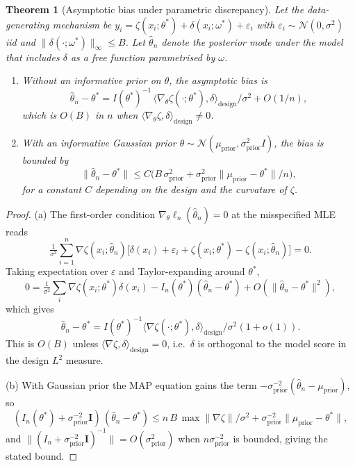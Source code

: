 \documentclass[11pt]{article}
\newtheorem{theorem}{Theorem}
\theoremstyle{definition}
\theoremstyle{remark}
\newcommand{\dotp}[2]{\langle #1, #2 \rangle}
\newcommand{\norm}[1]{\lVert #1 \rVert}
\begin{document}
\begin{theorem}[Asymptotic bias under parametric discrepancy]\label{thm:bias}
Let the data-generating mechanism be $y_i=\zeta(x_i;\theta^*)+\delta(x_i;\omega^*)+\varepsilon_i$
with $\varepsilon_i\sim\mathcal N(0,\sigma^2)$ iid and $\norm{\delta(\cdot;\omega^*)}_\infty\le B$. Let
$\hat\theta_n$ denote the posterior mode under the model that includes $\delta$ as a free
function parametrised by $\omega$.
\begin{enumerate}[label=(\alph*)]
  \item Without an informative prior on $\theta$, the asymptotic bias is
        \[
          \hat\theta_n-\theta^* = I(\theta^*)^{-1}\,\dotp{\nabla_\theta\zeta(\cdot;\theta^*)}{\delta}_{\mathrm{design}}/\sigma^2 + O(1/n),
        \]
        which is $O(B)$ in $n$ when $\dotp{\nabla_\theta\zeta}{\delta}_{\mathrm{design}}\neq 0$.
  \item With an informative Gaussian prior $\theta\sim\mathcal N(\mu_{\mathrm{prior}},\sigma_{\mathrm{prior}}^2 I)$, the bias is
        bounded by
        \[
          \norm{\hat\theta_n-\theta^*}\le C\bigl(B\,\sigma_{\mathrm{prior}}^2 + \sigma_{\mathrm{prior}}^2\norm{\mu_{\mathrm{prior}}-\theta^*}/n\bigr),
        \]
        for a constant $C$ depending on the design and the curvature of $\zeta$.
\end{enumerate}
\end{theorem}

\begin{proof}
(a) The first-order condition $\nabla_\theta\ell_n(\hat\theta_n)=0$ at the misspecified MLE
reads
\[
  \tfrac{1}{\sigma^2}\sum_{i=1}^n\nabla\zeta(x_i;\hat\theta_n)\bigl[\delta(x_i)+\varepsilon_i+\zeta(x_i;\theta^*)-\zeta(x_i;\hat\theta_n)\bigr]=0.
\]
Taking expectation over $\varepsilon$ and Taylor-expanding around $\theta^*$,
\[
  0 = \tfrac{1}{\sigma^2}\sum_i\nabla\zeta(x_i;\theta^*)\delta(x_i) - I_n(\theta^*)(\hat\theta_n-\theta^*) + O(\norm{\hat\theta_n-\theta^*}^2),
\]
which gives
\[
  \hat\theta_n-\theta^*=I(\theta^*)^{-1}\dotp{\nabla\zeta(\cdot;\theta^*)}{\delta}_{\mathrm{design}}/\sigma^2(1+o(1)).
\]
This is $O(B)$ unless $\dotp{\nabla\zeta}{\delta}_{\mathrm{design}}=0$, i.e.\ $\delta$ is orthogonal
to the model score in the design $L^2$ measure.

(b) With Gaussian prior the MAP equation gains the term $-\sigma_{\mathrm{prior}}^{-2}(\hat\theta_n-\mu_{\mathrm{prior}})$, so
\[
  (I_n(\theta^*)+\sigma_{\mathrm{prior}}^{-2}\mathbf{I})\,(\hat\theta_n-\theta^*)\le n\,B\,\max\norm{\nabla\zeta}/\sigma^2 + \sigma_{\mathrm{prior}}^{-2}\norm{\mu_{\mathrm{prior}}-\theta^*},
\]
and $\norm{(I_n+\sigma_{\mathrm{prior}}^{-2}\mathbf{I})^{-1}}=O(\sigma_{\mathrm{prior}}^2)$ when
$n\sigma_{\mathrm{prior}}^{-2}$ is bounded, giving the stated bound.
\end{proof}
\end{document}
